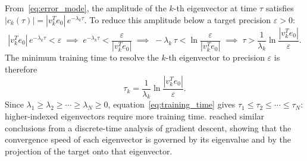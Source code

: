 From~\eqref{eq:error_mode}, the amplitude of the $k$-th eigenvector at time $\tau$ satisfies $|c_k(\tau)| = |v_k^T e_0|\,e^{-\lambda_k\tau}$. To reduce this amplitude below a target precision $\varepsilon > 0$:
\begin{equation}
    |v_k^T e_0|\,e^{-\lambda_k\tau} < \varepsilon
    \;\implies\;
    e^{-\lambda_k\tau} < \frac{\varepsilon}{|v_k^T e_0|}
    \;\implies\;
    -\lambda_k\,\tau < \ln\frac{\varepsilon}{|v_k^T e_0|}
    \;\implies\;
    \tau > \frac{1}{\lambda_k}\ln\frac{|v_k^T e_0|}{\varepsilon}.
\end{equation}
The minimum training time to resolve the $k$-th eigenvector to precision $\varepsilon$ is therefore
\begin{equation}\label{eq:training_time}
    \tau_k = \frac{1}{\lambda_k}\ln\frac{|v_k^T e_0|}{\varepsilon}.
\end{equation}
Since $\lambda_1 \geq \lambda_2 \geq \cdots \geq \lambda_{N} \geq 0$, equation~\eqref{eq:training_time} gives $\tau_1 \leq \tau_2 \leq \cdots \leq \tau_{N}$: higher-indexed eigenvectors require more training time. \textcite{arora2019} reached similar conclusions from a discrete-time analysis of gradient descent, showing that the convergence speed of each eigenvector is governed by its eigenvalue and by the projection of the target onto that eigenvector.

